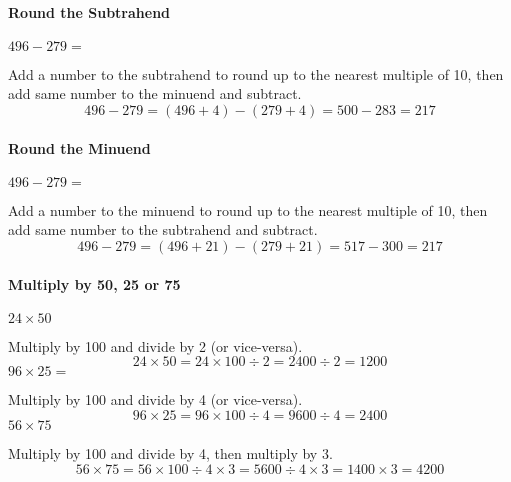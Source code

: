 \paragraph*{Round the Subtrahend}
\begin{example}
\Item $496 - 279 =$

Add a number to the subtrahend to round up to the nearest multiple of 10, then add same
number to the minuend and subtract.
\begin{equation*}
496 - 279 = (496 + 4) - (279 + 4) = 500 - 283 = 217
\end{equation*}
\end{example}
\paragraph*{Round the Minuend}
\begin{example}
\Item $496-279 =$

Add a number to the minuend to round up to the nearest multiple of 10, then add same
number to the subtrahend and subtract.
\begin{equation*}
496 - 279 = (496 + 21) - (279 + 21) = 517 - 300 = 217
\end{equation*}
\end{example}
\paragraph*{Multiply by 50, 25 or 75}
\begin{example}
\Item $24\times 50$

Multiply by 100 and divide by 2 (or vice-versa).
\begin{equation*}
24 \times 50 = 24 \times 100 \div 2 = 2400 \div 2 = 1200
\end{equation*}
\Item $96\times 25=$

Multiply by 100 and divide by 4 (or vice-versa).
\begin{equation*}
96 \times 25 = 96 \times 100 \div 4 = 9600 \div 4 = 2400
\end{equation*}
\Item $56\times 75$

Multiply by 100 and divide by 4, then multiply by 3.
\begin{equation*}
56 \times 75 = 56 \times 100 \div 4 \times 3 = 5600 \div 4 \times 3 = 1400 \times 3 = 4200
\end{equation*}
\end{example}
